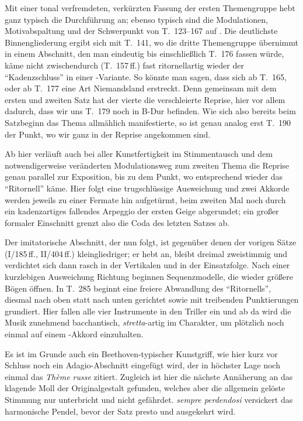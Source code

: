 Mit einer tonal verfremdeten, verkürzten Fassung der ersten
Themengruppe hebt ganz typisch die Durchführung an; ebenso typisch
sind die Modulationen, Motivabspaltung und der Schwerpunkt von
T.~123–167 auf .  Die deutlichste Binnengliederung
ergibt sich mit T.~141, wo die dritte Themengruppe übernimmt in
einem Abschnitt, den man eindeutig bis einschließlich T.~176 fassen
würde, käme nicht zwischendurch (T.~157\,ff.) fast ritornellartig
wieder der \enquote{Kadenzschluss} in einer -Variante.  So
könnte man sagen, dass sich ab T.~165, oder ab T.~177 eine Art
Niemandsland erstreckt.  Denn gemeinsam mit dem ersten und zweiten
Satz hat der vierte die verschleierte Reprise, hier vor allem dadurch,
dass wir uns T.~179 noch in B-Dur befinden.  Wie sich also bereits
beim Satzbeginn das Thema allmählich manifestierte, so ist genau
analog erst T.~190 der Punkt, wo wir ganz in der Reprise angekommen
sind.

Ab hier verläuft auch bei aller Kunstfertigkeit im Stimmentausch
und dem notwendigerweise veränderten Modulationsweg zum zweiten
Thema die Reprise genau parallel zur Exposition, bis zu dem Punkt,
wo entsprechend wieder das \enquote{Ritornell} käme.  Hier folgt
eine trugschlüssige Ausweichung und zwei Akkorde werden 
jeweils zu einer Fermate hin aufgetürmt, beim zweiten Mal noch
durch ein kadenzartiges fallendes Arpeggio der ersten Geige
abgerundet; ein großer formaler Einschnitt grenzt also die Coda
des letzten Satzes ab.

Der imitatorische Abschnitt, der nun folgt, ist gegenüber denen
der vorigen Sätze (I/185\,ff., II/404\,ff.) kleingliedriger; er hebt
 an, bleibt dreimal zweistimmig und verdichtet sich
dann rasch in der Vertikalen und in der Einsatzfolge.  Nach einer
kurzlebigen Ausweichung Richtung  beginnen
Sequenzmodelle, die wieder größere Bögen öffnen.  In T.~285 beginnt
eine freiere Abwandlung des \enquote{Ritornells}, diesmal nach oben
statt nach unten gerichtet sowie mit treibenden Punktierungen
grundiert.  Hier fallen alle vier Instrumente in den Triller ein
und ab da wird die Musik zunehmend bacchantisch, \textit{stretta}-artig
im Charakter, um plötzlich noch einmal auf einem -Akkord
einzuhalten.

Es ist im Grunde auch ein Beethoven-typischer Kunstgriff, wie hier
kurz vor Schluss noch ein Adagio-Abschnitt eingefügt wird, der in
höchster Lage noch einmal das \textit{Thème russe} zitiert.  Zugleich
ist hier die nächste Annäherung an das klagende Moll der Originalgestalt
gefunden, welches aber die allgemein gelöste Stimmung nur unterbricht und
nicht gefährdet.  \textit{sempre perdendosi} versickert das harmonische
Pendel, bevor der Satz presto und  ausgekehrt wird.